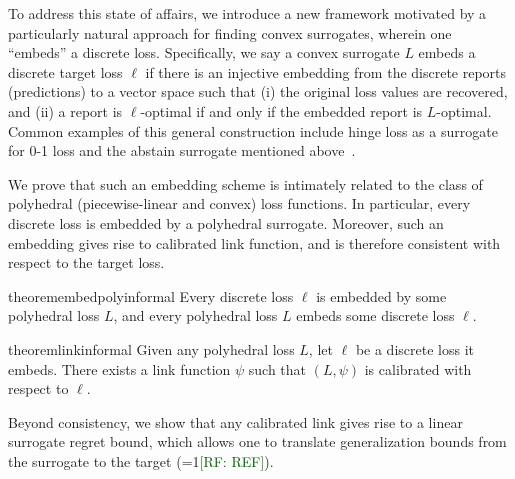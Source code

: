 \documentclass[11pt]{article}
\newcommand{\restatehack}[1]{}   %
\newcommand{\Comments}{1}
\newcommand{\mynote}[2]{\ifnum\Comments=1\textcolor{#1}{#2}\fi}
\newcommand{\raf}[1]{\mynote{darkgreen}{[RF: #1]}}
\newtheorem{theorem}{Theorem}
\begin{document}
To address this state of affairs, we introduce a new framework motivated by a particularly natural approach for finding convex surrogates, wherein one ``embeds'' a discrete loss.
Specifically, we say a convex surrogate $L$ embeds a discrete target loss $\ell$ if there is an injective embedding from the discrete reports (predictions) to a vector space such that (i) the original loss values are recovered, and (ii) a report is $\ell$-optimal if and only if the embedded report is $L$-optimal.
Common examples of this general construction include hinge loss as a surrogate for 0-1 loss and the abstain surrogate mentioned above~\citep{ramaswamy2018consistent}.

We prove that such an embedding scheme is intimately related to the class of polyhedral (piecewise-linear and convex) loss functions.
In particular, every discrete loss is embedded by a polyhedral surrogate.
Moreover, such an embedding gives rise to calibrated link function, and is therefore consistent with respect to the target loss.


\restatehack{
  \begin{theorem}
    \label{thm:embed-poly-main}
    \label{thm:link-main}
  \end{theorem}}

\begin{restatable}{theorem}{embedpolyinformal}\label{thm:embed-poly-main}
  Every discrete loss $\ell$ is embedded by some polyhedral loss $L$, and every polyhedral loss $L$ embeds some discrete loss $\ell$.
\end{restatable}
\begin{restatable}{theorem}{linkinformal}\label{thm:link-main}
  Given any polyhedral loss $L$, let $\ell$ be a discrete loss it embeds. There exists a link function $\psi$ such that $(L,\psi)$ is calibrated with respect to $\ell$.
\end{restatable}
\noindent
Beyond consistency, we show that any calibrated link gives rise to a linear surrogate regret bound, which allows one to translate generalization bounds from the surrogate to the target (\raf{REF}).
\end{document}
